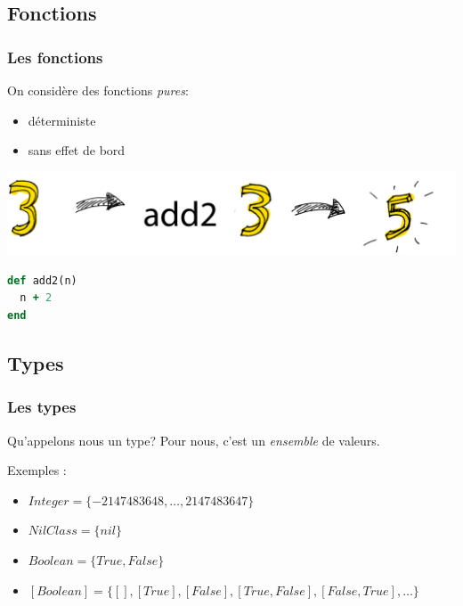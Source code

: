 \documentclass{beamer}
\begin{document}
\subsection{Fonctions}
\begin{frame}[fragile]
\frametitle{Les fonctions}
\begin{block}{}
On considère des fonctions \emph{pures}:
\begin{itemize}
\item déterministe
\item sans effet de bord
\end{itemize}
\end{block}
\begin{center}
\includegraphics[scale=0.2]{fct.png}
\end{center}
\pause
\begin{block}{}
\begin{lstlisting}[language=ruby,basicstyle=\ttfamily,keywordstyle=\color{red}]
def add2(n)
  n + 2
end
\end{lstlisting}
\end{block}
\end{frame}

\subsection{Types}
\begin{frame}
\frametitle{Les types}
\begin{block}{Qu'appelons nous un type?}
Pour nous, c'est un \emph{ensemble} de valeurs.
\end{block}
\pause
\begin{exampleblock}{Exemples :}
\begin{itemize}
\item $Integer = \{-2 147 483 648, \dots, 2 147 483 647\}$
\item $NilClass = \{nil\}$
\item $Boolean = \{True, False\}$
\pause
\item $[Boolean] = \{[], [True], [False], [True, False], [False, True], \dots\}$
\end{itemize}
\end{exampleblock}
\end{frame}
\end{document}

